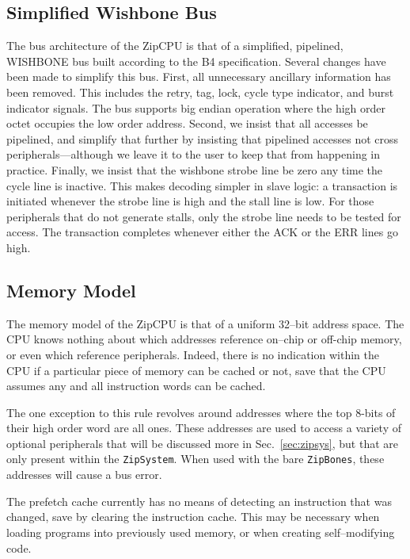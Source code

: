 \documentclass{gqtekspec}
\begin{document}
\subsection{Simplified Wishbone Bus}\label{ssec:bus}
The bus architecture of the ZipCPU is that of a simplified, pipelined, WISHBONE
bus built according to the B4 specification.  Several changes have been made to
simplify this bus.  First, all unnecessary ancillary information has been
removed.  This includes the retry, tag, lock, cycle type indicator, and burst
indicator signals.  The bus supports big endian operation where the high order
octet occupies the low order address.  Second, we insist that all
accesses be pipelined, and simplify that further by insisting that pipelined
accesses not cross peripherals---although we leave it to the user to keep that
from happening in practice.  Finally, we insist that the wishbone strobe line
be zero any time the cycle line is inactive.  This makes decoding simpler
in slave logic: a transaction is initiated whenever the strobe line is high
and the stall line is low.  For those peripherals that do not generate stalls,
only the strobe line needs to be tested for access.  The transaction completes
whenever either the ACK or the ERR lines go high.

\subsection{Memory Model}\label{ssec:memory}
The memory model of the ZipCPU is that of a uniform 32--bit address space.
The CPU knows nothing about which addresses reference on--chip or off-chip
memory, or even which reference peripherals.  Indeed, there is no indication
within the CPU if a particular piece of memory can be cached or not, save that
the CPU assumes any and all instruction words can be cached.

The one exception to this rule revolves around addresses where the top 8-bits
of their high order word are all ones.  These addresses are used to access a
variety of optional peripherals that will be discussed more in
Sec.~\ref{sec:zipsys}, but that are only present within the {\tt ZipSystem}.
When used with the bare {\tt ZipBones}, these addresses will cause a bus error.

The prefetch cache currently has no means of detecting an instruction that
was changed, save by clearing the instruction cache.  This may be necessary
when loading programs into previously used memory, or when creating
self--modifying code.
\end{document}
